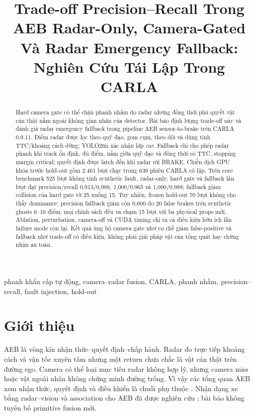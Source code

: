 \documentclass[conference]{IEEEtran}
\title{Trade-off Precision--Recall Trong AEB Radar-Only, Camera-Gated Và Radar Emergency Fallback: Nghiên Cứu Tái Lập Trong CARLA}
\author{
\IEEEauthorblockN{Mai Việt Hoàng và Phạm Đức An}
\IEEEauthorblockA{\textit{Đại học Bách khoa Hà Nội}\\
Hà Nội, Việt Nam\\hoangmai04222@gmail.com}
}
\begin{document}
\maketitle

\begin{abstract}
Hard camera gate có thể chặn phanh nhầm do radar nhưng đồng thời phủ quyết vật
cản thật nằm ngoài không gian nhãn của detector. Bài báo định lượng trade-off này
và đánh giá radar emergency fallback trong pipeline AEB sensor-to-brake trên
CARLA 0.9.11. Điểm radar được lọc theo quỹ đạo, gom cụm, theo dõi và dùng tính
TTC/khoảng cách dừng; YOLO26n xác nhận lớp \emph{car}. Fallback chỉ cho phép
radar phanh khi track ổn định, đủ điểm, nằm giữa quỹ đạo và đồng thời có TTC,
stopping margin critical; quyết định được latch đến khi radar rời BRAKE. Chiến
dịch GPU khóa trước hold-out gồm 2.461 lượt chạy trong 639 phiên CARLA cô lập.
Trên core benchmark 525 lượt không tính synthetic fault, radar-only, hard gate
và fallback lần lượt đạt precision/recall 0,913/0,988, 1,000/0,965 và
1,000/0,988; fallback giảm collision của hard gate từ 25 xuống 15. Tuy nhiên,
frozen hold-out 70 lượt không cho thấy dominance: precision fallback giảm còn
0,600 do 20 false brakes trên synthetic ghosts 6--10 điểm; mọi chính sách đều
va chạm 15 lượt với ba physical props mới. Ablation, perturbation, camera-off và
CUDA timing chỉ ra cả điều kiện hữu ích lẫn failure mode còn lại. Kết quả ủng hộ
camera gate như cơ chế giảm false-positive và fallback như trade-off có điều
kiện, không phải giải pháp vật cản tổng quát hay chứng nhận an toàn.
\end{abstract}

\begin{IEEEkeywords}
phanh khẩn cấp tự động, camera--radar fusion, CARLA, phanh nhầm,
precision--recall, fault injection, hold-out
\end{IEEEkeywords}

\section{Giới thiệu}
AEB là vòng kín nhận thức--quyết định--chấp hành. Radar đo trực tiếp khoảng cách
và vận tốc xuyên tâm nhưng một return chưa chắc là vật cản thật trên đường ego.
Camera có thể loại mục tiêu radar không hợp lý, nhưng camera miss hoặc vật ngoài
nhãn không chứng minh đường trống. Vì vậy các tổng quan AEB xem nhận thức, quyết
định và điều khiển là chuỗi phụ thuộc \cite{yang2022aebreview}. Nhận dạng xe bằng
radar--vision và association cho AEB đã được nghiên cứu
\cite{kim2013vehicle,hsu2015noise}; bài báo không tuyên bố primitive fusion mới.
\end{document}
